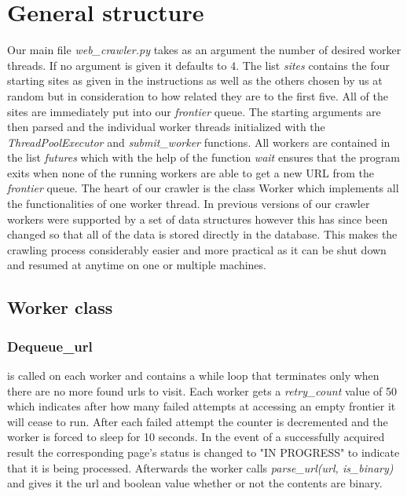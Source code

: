 \documentclass[runningheads]{llncs}
\begin{document}
\section{General structure}
Our main file \textit{web\_crawler.py} takes as an argument the number of desired worker threads. If no argument is given it defaults to 4. The list \textit{sites} contains the four starting sites as given in the instructions as well as the others chosen by us at random but in consideration to how related they are to the first five. All of the sites are immediately put into our \textit{frontier} queue. The starting arguments are then parsed and the individual worker threads initialized with the \textit{ThreadPoolExecutor} and \textit{submit\_worker} functions. All workers are contained in the list \textit{futures} which with the help of the function \textit{wait} ensures that the program exits when none of the running workers are able to get a new URL from the \textit{frontier} queue.
The heart of our crawler is the class Worker which implements all the functionalities of one worker thread. In previous versions of our crawler workers were supported by a set of data structures however this has since been changed so that all of the data is stored directly in the database. This makes the crawling process considerably easier and more practical as it can be shut down and resumed at anytime on one or multiple machines.

\subsection{Worker class}

\subsubsection{Dequeue\_url}
is called on each worker and contains a while loop that terminates only when there are no more found urls to visit. Each worker gets a \textit{retry\_count} value of 50 which indicates after how many failed attempts at accessing an empty frontier it will cease to run. After each failed attempt the counter is decremented and the worker is forced to sleep for 10 seconds. In the event of a successfully acquired result the corresponding page's status is changed to "IN PROGRESS" to indicate that it is being processed. Afterwards the worker calls \textit{parse\_url(url, is\_binary)} and gives it the url and boolean value whether or not the contents are binary. 
\end{document}

